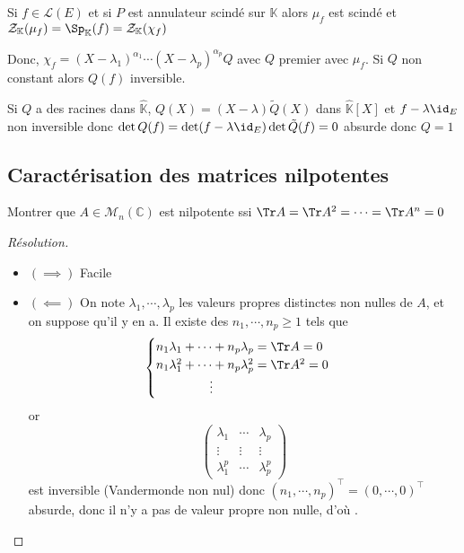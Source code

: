 \begin{rem}
    Si $f\in\mathcal L(E)$ et si $P$ est annulateur scindé sur $\mathbb K$ alors $\mu_f$ est scindé et $\mathcal Z_{\mathbb K}(\mu_f)=\Sp_{\mathbb K}(f)=\mathcal Z_{\mathbb K}(\chi_f)$

    Donc, $\chi_f=(X-\lambda_1)^{\alpha_1}\cdots (X-\lambda_p)^{\alpha_p}Q$ avec $Q$ premier avec $\mu_f$. Si $Q$ non constant alors $Q(f)$ inversible.

    Si $Q$ a des racines dans $\widehat{\mathbb K}$, $Q(X)=(X-\lambda)\tilde Q(X)$ dans $\widehat {\mathbb K}[X]$ et $f-\lambda\id_E$ non inversible donc $\det Q(f)=\det (f-\lambda\id_E)\det\tilde Q(f)=0$ absurde donc $Q=1$
\end{rem}

\subsection{Caractérisation des matrices nilpotentes}

\begin{exo}
    Montrer que $A\in\mathcal M_n(\mathbb C)$ est nilpotente ssi $\Tr A=\Tr A^2=\cdots =\Tr A^n=0$
\end{exo}

\begin{proof}[Résolution]~
    \begin{itemize}
        \item $(\implies)$ Facile
        \item $(\impliedby)$ On note $\lambda_1, \cdots, \lambda_p$ les valeurs propres distinctes non nulles de $A$, et on suppose qu'il y en a. Il existe des $n_1, \cdots, n_p\geq 1$ tels que \[
                \begin{cases}
                    n_1\lambda_1+\cdots+n_p\lambda_p=\Tr A=0\\
                    n_1\lambda_1^2+\cdots+n_p\lambda_p^2=\Tr A^2=0\\
                    \hspace{1.5cm}\vdots
                \end{cases}
            \]
            or \[
                \begin{pmatrix}
                    \lambda_1 & \cdots & \lambda_p \\
                    \vdots & \vdots & \vdots \\
                    \lambda_1^p & \cdots & \lambda_p^p
                \end{pmatrix}
            \]
            est inversible (Vandermonde non nul) donc $(n_1, \cdots, n_p)^\top=(0, \cdots, 0)^\top$ absurde, donc il n'y a pas de valeur propre non nulle, d'où \conc.
    \end{itemize}
\end{proof}

